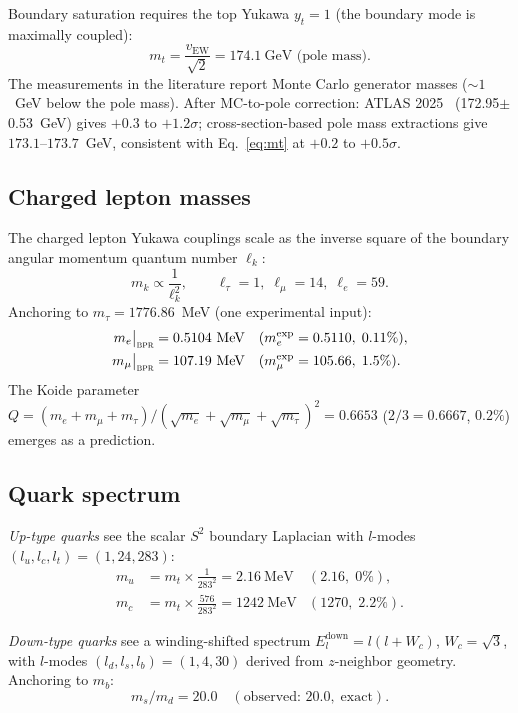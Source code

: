 \documentclass[aps,prd,twocolumn,superscriptaddress,longbibliography,nofootinbib]{revtex4-2}
\newcommand{\Stwo}{S^2}
\newcommand{\vEW}{v_{\mathrm{EW}}}
\newcommand{\bpr}{\textsc{bpr}}
\begin{document}
Boundary saturation requires the top Yukawa $y_t = 1$ (the boundary mode
is maximally coupled):
\begin{equation}
m_t = \frac{\vEW}{\sqrt{2}} = 174.1~\text{GeV (pole mass)}.
\label{eq:mt}
\end{equation}
The measurements in the literature report Monte Carlo generator masses
($\sim 1$~GeV below the pole mass).  After MC-to-pole correction:
ATLAS 2025~\cite{ATLAS2025mt} (172.95$\pm$0.53~GeV) gives $+0.3$ to $+1.2\sigma$;
cross-section-based pole mass extractions give $173.1$--$173.7$~GeV,
consistent with Eq.~\eqref{eq:mt} at $+0.2$ to $+0.5\sigma$.

\subsection{Charged lepton masses}

The charged lepton Yukawa couplings scale as the inverse square of the
boundary angular momentum quantum number $\ell_k$:
\begin{equation}
m_k \propto \frac{1}{\ell_k^2}, \qquad
\ell_\tau = 1,\; \ell_\mu = 14,\; \ell_e = 59.
\end{equation}
Anchoring to $m_\tau = 1776.86$~MeV (one experimental input):
\begin{align}
m_e\big|_{\bpr} &= 0.5104~\text{MeV} &(m_e^{\text{exp}} &= 0.5110,\; 0.11\%), \\
m_\mu\big|_{\bpr} &= 107.19~\text{MeV} &(m_\mu^{\text{exp}} &= 105.66,\; 1.5\%).
\end{align}
The Koide parameter $Q = (m_e + m_\mu + m_\tau)/(\sqrt{m_e}+\sqrt{m_\mu}+\sqrt{m_\tau})^2
= 0.6653$ ($2/3 = 0.6667$, $0.2\%$) emerges as a prediction.

\subsection{Quark spectrum}

\textit{Up-type quarks} see the scalar $\Stwo$ boundary Laplacian with
$l$-modes $(l_u, l_c, l_t) = (1, 24, 283)$:
\begin{align}
m_u &= m_t \times \frac{1}{283^2} = 2.16~\text{MeV} & (2.16,\; 0\%), \\
m_c &= m_t \times \frac{576}{283^2} = 1242~\text{MeV} & (1270,\; 2.2\%).
\end{align}

\textit{Down-type quarks} see a winding-shifted spectrum
$E_l^{\mathrm{down}} = l(l+W_c)$, $W_c = \sqrt{3}$,
with $l$-modes $(l_d, l_s, l_b) = (1, 4, 30)$ derived from $z$-neighbor
geometry.  Anchoring to $m_b$:
\begin{equation}
m_s/m_d = 20.0 \quad (\text{observed: }20.0,\; \text{exact}).
\end{equation}
\end{document}
